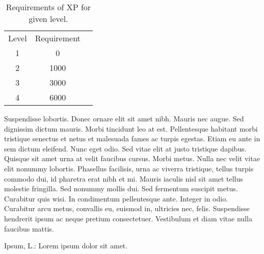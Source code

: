 \documentclass[english, thesismargins, thesislinespacing, twoside, draft]{rnthesis}
\begin{document}
\begin{table}
\begin{center}
\begin{tabular}{ccc}
Level & Requirement\\
1 & 0\\
2 & 1000\\
3 & 3000\\
4 & 6000
\end{tabular}
\end{center}
\caption{Requirements of XP for given level.}
\end{table}
Suspendisse lobortis. Donec ornare elit sit amet nibh. Mauris nec
augue. Sed dignissim dictum mauris. Morbi tincidunt leo at est.
Pellentesque habitant morbi tristique senectus et netus et
malesuada fames ac turpis egestas. Etiam eu ante in sem dictum
eleifend. Nunc eget odio. Sed vitae elit at justo tristique
dapibus. Quisque sit amet urna at velit faucibus cursus.
Morbi metus. Nulla nec velit vitae elit
nonummy lobortis. Phasellus facilisis, urna ac viverra tristique,
tellus turpis commodo dui, id pharetra erat nibh et mi. Mauris
iaculis nisl sit amet tellus molestie fringilla. Sed nonummy mollis
dui. Sed fermentum suscipit metus. Curabitur quis wisi. In
condimentum pellentesque ante. Integer in odio. Curabitur arcu
metus, convallis eu, euismod in, ultricies nec, felis. Suspendisse
hendrerit ipsum ac neque pretium consectetuer. Vestibulum et diam
vitae nulla faucibus mattis. 


%

\begin{thebibliography}{9}
 Ipsum, L.: Lorem ipsum dolor sit amet.
\end{thebibliography}
%
\end{document}
